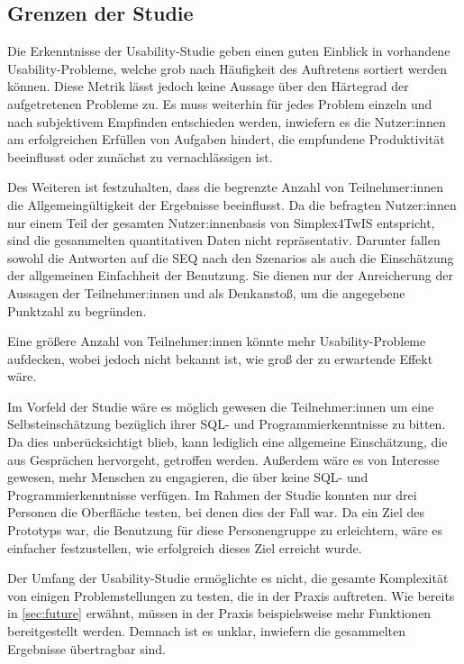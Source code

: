 \subsection{Grenzen der Studie}
Die Erkenntnisse der Usability-Studie geben einen guten Einblick in vorhandene Usability-Probleme, welche grob nach Häufigkeit des Auftretens sortiert werden können. Diese Metrik lässt jedoch keine Aussage über den Härtegrad der aufgetretenen Probleme zu. Es muss weiterhin für jedes Problem einzeln und nach subjektivem Empfinden entschieden werden, inwiefern es die Nutzer:innen am erfolgreichen Erfüllen von Aufgaben hindert, die empfundene Produktivität beeinflusst oder zunächst zu vernachlässigen ist.

\pskip
Des Weiteren ist festzuhalten, dass die begrenzte Anzahl von Teilnehmer:innen die All­ge­mein­gül­tig­keit der Ergebnisse beeinflusst. Da die befragten Nutzer:innen nur einem Teil der gesamten Nutzer:innenbasis von Simplex4TwIS entspricht, sind die gesammelten quantitativen Daten nicht repräsentativ. Darunter fallen sowohl die Antworten auf die \ac{SEQ} nach den Szenarios als auch die Einschätzung der allgemeinen Einfachheit der Benutzung. Sie dienen nur der Anreicherung der Aussagen der Teilnehmer:innen und als Denkanstoß, um die angegebene Punktzahl zu begründen.

Eine größere Anzahl von Teilnehmer:innen könnte mehr Usability-Probleme aufdecken, wobei jedoch nicht bekannt ist, wie groß der zu erwartende Effekt wäre.

\pskip
Im Vorfeld der Studie wäre es möglich gewesen die Teilnehmer:innen um eine Selbsteinschätzung bezüglich ihrer \ac{SQL}- und Programmierkenntnisse zu bitten. Da dies unberücksichtigt blieb, kann lediglich eine allgemeine Einschätzung, die aus Gesprächen hervorgeht, getroffen werden. Außerdem wäre es von Interesse gewesen, mehr Menschen zu engagieren, die über keine \ac{SQL}- und Programmierkenntnisse verfügen. Im Rahmen der Studie konnten nur drei Personen die Oberfläche testen, bei denen dies der Fall war. Da ein Ziel des Prototyps war, die Benutzung für diese Personengruppe zu erleichtern, wäre es einfacher festzustellen, wie erfolgreich dieses Ziel erreicht wurde.

\pskip
Der Umfang der Usability-Studie ermöglichte es nicht, die gesamte Komplexität von einigen Problemstellungen zu testen, die in der Praxis auftreten. Wie bereits in \ref{sec:future} erwähnt, müssen in der Praxis beispielsweise mehr Funktionen bereitgestellt werden. Demnach ist es unklar, inwiefern die gesammelten Ergebnisse übertragbar sind.
